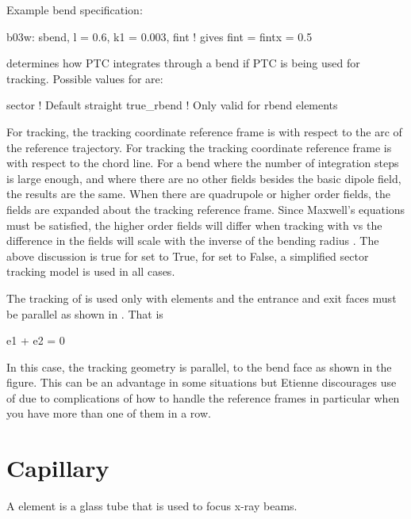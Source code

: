 Example bend specification:
\begin{example}
  b03w: sbend, l = 0.6, k1 = 0.003, fint  ! gives fint = fintx = 0.5
\end{example}


 determines how PTC integrates through a bend
if PTC is being used for tracking. Possible values for
 are:
\begin{example}
  sector      ! Default
  straight
  true_rbend  ! Only valid for rbend elements
\end{example}
For  tracking, the tracking coordinate reference frame is
with respect to the arc of the reference trajectory. For 
tracking the tracking coordinate reference frame is with respect to the
chord line. For a bend where the number of integration steps is large
enough, and where there are no other fields besides the basic dipole
field, the results are the same.  When there are quadrupole or higher
order fields, the fields are expanded about the tracking reference
frame. Since Maxwell's equations must be satisfied, the higher order
fields will differ when tracking with  vs  the
difference in the fields will scale with the inverse of the bending
radius . The above discussion is true for
 set to True, for  set to
False, a simplified sector tracking model is used in all cases.

The  tracking of  is used only
with  elements and the entrance and exit faces must be parallel
as shown in . That is
\begin{example}
  e1 + e2 = 0
\end{example}
In this case, the tracking geometry is parallel, to the bend face as
shown in the figure. This can be an advantage in some situations but
Etienne discourages use of  due to complications of how
to handle the reference frames in particular when you have more than
one of them in a row.

\section{Capillary}
\label{s:capillary}

A  element is a glass tube that is used to focus x-ray
beams.

